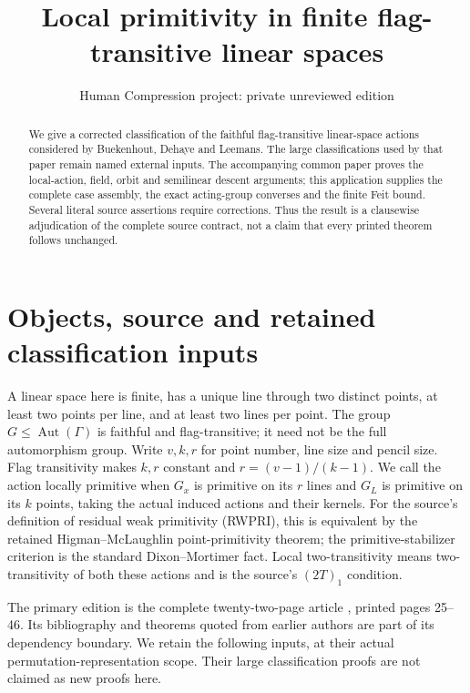 \documentclass[11pt,a4paper]{article}
\title{Local primitivity in finite flag-transitive linear spaces}
\author{Human Compression project: private unreviewed edition}
\date{}
\begin{document}
\maketitle
\begin{abstract}
We give a corrected classification of the faithful flag-transitive
linear-space actions considered by Buekenhout, Dehaye and Leemans.
The large classifications used by that paper remain named external inputs.
The accompanying common paper proves the local-action, field, orbit and
semilinear descent arguments; this application supplies the complete
case assembly, the exact acting-group converses and the finite Feit
bound. Several literal source assertions require corrections. Thus the
result is a clausewise adjudication of the complete source contract,
not a claim that every printed theorem follows unchanged.
\end{abstract}

\section{Objects, source and retained classification inputs}
A linear space here is finite, has a unique line through two distinct
points, at least two points per line, and at least two lines per point.
The group $G\leq\operatorname{Aut}(\Gamma)$ is faithful and
flag-transitive; it need not be the full automorphism group. Write $v,k,r$
for point number, line size and pencil size. Flag transitivity makes $k,r$
constant and $r=(v-1)/(k-1)$. We call the action locally primitive when
$G_x$ is primitive on its $r$ lines and $G_L$ is primitive on its $k$
points, taking the actual induced actions and their kernels. For the
source's definition of residual weak primitivity (RWPRI), this is
equivalent by the retained Higman--McLaughlin point-primitivity theorem;
the primitive-stabilizer criterion is the standard Dixon--Mortimer fact.
Local two-transitivity means two-transitivity of both these actions and
is the source's $(2T)_1$ condition.

The primary edition is the complete twenty-two-page article
\cite{BDL}, printed pages 25--46. Its bibliography and theorems quoted
from earlier authors are part of its dependency boundary. We retain the
following inputs, at their actual permutation-representation scope.
Their large classification proofs are not claimed as new proofs here.
\end{document}
